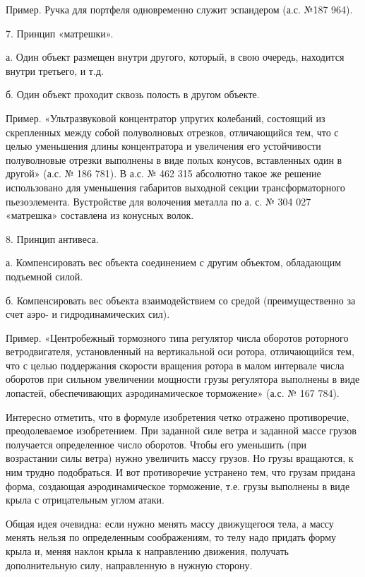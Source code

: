 Пример. Ручка  для портфеля одновременно служит  эспандером (а.с. №187
964).


7. Принцип «матрешки».

а.  Один объект  размещен  внутри другого,  который,  в свою  очередь,
находится внутри третьего, и т.д.

б. Один объект проходит сквозь полость в другом объекте.

Пример. «Ультразвуковой  концентратор упругих колебаний,  состоящий из
скрепленных между собой полуволновых отрезков, отличающийся тем, что с
целью  уменьшения длины  концентратора и  увеличения его  устойчивости
полуволновые отрезки выполнены в  виде полых конусов, вставленных один
в  другой»  (а.с.  № 186  781).  В  а.с.  №  462 315  абсолютно  такое
же  решение  использовано  для уменьшения  габаритов  выходной  секции
трансформаторного пьезоэлемента. Вустройстве  для волочения металла по
а. с. № 304 027 «матрешка» составлена из конусных волок.

8. Принцип антивеса.

а.  Компенсировать   вес  объекта   соединением  с   другим  объектом,
обладающим подъемной силой.

б.    Компенсировать   вес    объекта   взаимодействием    со   средой
(преимущественно за счет аэро- и гидродинамических сил).

Пример.  «Центробежный   тормозного  типа  регулятор   числа  оборотов
роторного  ветродвигателя, установленный  на вертикальной  оси ротора,
отличающийся тем, что  с целью поддержания скорости  вращения ротора в
малом интервале  числа оборотов при сильном  увеличении мощности грузы
регулятора выполнены в  виде лопастей, обеспечивающих аэродинамическое
торможение» (а.с. № 167 784).

Интересно  отметить,   что  в   формуле  изобретения   четко  отражено
противоречие,  преодолеваемое изобретением.  При  заданной силе  ветра
и  заданной  массе  грузов  получается  определенное  число  оборотов.
Чтобы  его  уменьшить (при  возрастании  силы  ветра) нужно  увеличить
массу  грузов. Но  грузы вращаются,  к ним  трудно подобраться.  И вот
противоречие  устранено  тем,  что  грузам  придана  форма,  создающая
аэродинамическое  торможение,  т.е. грузы  выполнены  в  виде крыла  с
отрицательным углом атаки.

Общая идея очевидна: если нужно менять массу движущегося тела, а массу
менять  нельзя  по определенным  соображениям,  то  телу надо  придать
форму крыла  и, меняя  наклон крыла  к направлению  движения, получать
дополнительную силу, направленную в нужную сторону.


